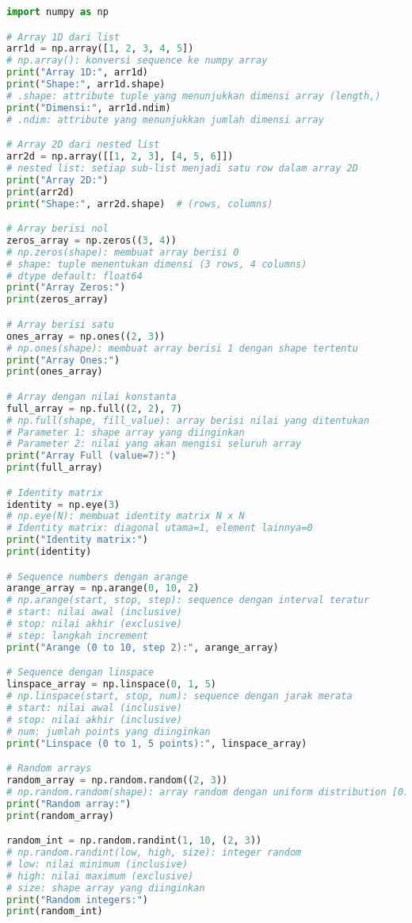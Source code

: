 \begin{lstlisting}[language=python, caption={Berbagai Cara Membuat Array}, style=python]
import numpy as np

# Array 1D dari list
arr1d = np.array([1, 2, 3, 4, 5])
# np.array(): konversi sequence ke numpy array
print("Array 1D:", arr1d)
print("Shape:", arr1d.shape)
# .shape: attribute tuple yang menunjukkan dimensi array (length,)
print("Dimensi:", arr1d.ndim)
# .ndim: attribute yang menunjukkan jumlah dimensi array

# Array 2D dari nested list
arr2d = np.array([[1, 2, 3], [4, 5, 6]])
# nested list: setiap sub-list menjadi satu row dalam array 2D
print("Array 2D:")
print(arr2d)
print("Shape:", arr2d.shape)  # (rows, columns)

# Array berisi nol
zeros_array = np.zeros((3, 4))
# np.zeros(shape): membuat array berisi 0
# shape: tuple menentukan dimensi (3 rows, 4 columns)
# dtype default: float64
print("Array Zeros:")
print(zeros_array)

# Array berisi satu
ones_array = np.ones((2, 3))
# np.ones(shape): membuat array berisi 1 dengan shape tertentu
print("Array Ones:")
print(ones_array)

# Array dengan nilai konstanta
full_array = np.full((2, 2), 7)
# np.full(shape, fill_value): array berisi nilai yang ditentukan
# Parameter 1: shape array yang diinginkan
# Parameter 2: nilai yang akan mengisi seluruh array
print("Array Full (value=7):")
print(full_array)

# Identity matrix
identity = np.eye(3)
# np.eye(N): membuat identity matrix N x N
# Identity matrix: diagonal utama=1, element lainnya=0
print("Identity matrix:")
print(identity)

# Sequence numbers dengan arange
arange_array = np.arange(0, 10, 2)
# np.arange(start, stop, step): sequence dengan interval teratur
# start: nilai awal (inclusive)
# stop: nilai akhir (exclusive)
# step: langkah increment
print("Arange (0 to 10, step 2):", arange_array)

# Sequence dengan linspace
linspace_array = np.linspace(0, 1, 5)
# np.linspace(start, stop, num): sequence dengan jarak merata
# start: nilai awal (inclusive)
# stop: nilai akhir (inclusive)
# num: jumlah points yang diinginkan
print("Linspace (0 to 1, 5 points):", linspace_array)

# Random arrays
random_array = np.random.random((2, 3))
# np.random.random(shape): array random dengan uniform distribution [0.0, 1.0)
print("Random array:")
print(random_array)

random_int = np.random.randint(1, 10, (2, 3))
# np.random.randint(low, high, size): integer random
# low: nilai minimum (inclusive)
# high: nilai maximum (exclusive)
# size: shape array yang diinginkan
print("Random integers:")
print(random_int)
\end{lstlisting}

